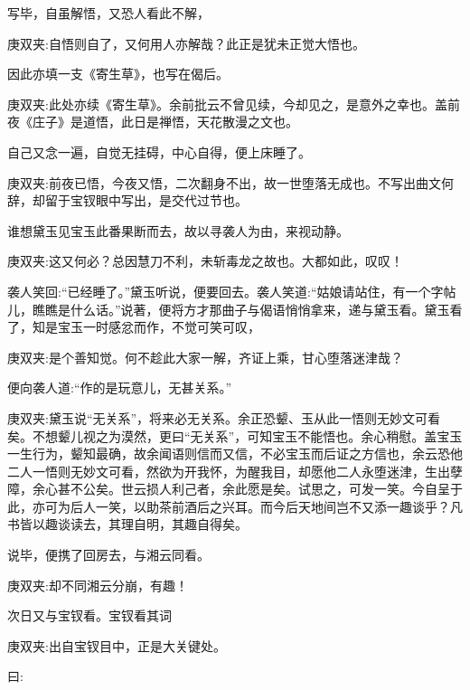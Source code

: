 \begin{parag}
    写毕，自虽解悟，又恐人看此不解，\begin{note}庚双夹:自悟则自了，又何用人亦解哉？此正是犹未正觉大悟也。\end{note}因此亦填一支《寄生草》，也写在偈后。\begin{note}庚双夹:此处亦续《寄生草》。余前批云不曾见续，今却见之，是意外之幸也。盖前夜《庄子》是道悟，此日是禅悟，天花散漫之文也。\end{note}自己又念一遍，自觉无挂碍，中心自得，便上床睡了。\begin{note}庚双夹:前夜已悟，今夜又悟，二次翻身不出，故一世堕落无成也。不写出曲文何辞，却留于宝钗眼中写出，是交代过节也。\end{note}
\end{parag}


\begin{parag}
    谁想黛玉见宝玉此番果断而去，故以寻袭人为由，来视动静。\begin{note}庚双夹:这又何必？总因慧刀不利，未斩毒龙之故也。大都如此，叹叹！\end{note}袭人笑回:“已经睡了。”黛玉听说，便要回去。袭人笑道:“姑娘请站住，有一个字帖儿，瞧瞧是什么话。”说著，便将方才那曲子与偈语悄悄拿来，递与黛玉看。黛玉看了，知是宝玉一时感忿而作，不觉可笑可叹，\begin{note}庚双夹:是个善知觉。何不趁此大家一解，齐证上乘，甘心堕落迷津哉？\end{note}便向袭人道:“作的是玩意儿，无甚关系。”\begin{note}庚双夹:黛玉说“无关系”，将来必无关系。余正恐颦、玉从此一悟则无妙文可看矣。不想颦儿视之为漠然，更曰“无关系”，可知宝玉不能悟也。余心稍慰。盖宝玉一生行为，颦知最确，故余闻语则信而又信，不必宝玉而后证之方信也，余云恐他二人一悟则无妙文可看，然欲为开我怀，为醒我目，却愿他二人永堕迷津，生出孽障，余心甚不公矣。世云损人利己者，余此愿是矣。试思之，可发一笑。今自呈于此，亦可为后人一笑，以助茶前酒后之兴耳。而今后天地间岂不又添一趣谈乎？凡书皆以趣谈读去，其理自明，其趣自得矣。\end{note}说毕，便携了回房去，与湘云同看。\begin{note}庚双夹:却不同湘云分崩，有趣！\end{note}次日又与宝钗看。宝钗看其词\begin{note}庚双夹:出自宝钗目中，正是大关键处。\end{note}曰:
\end{parag}


